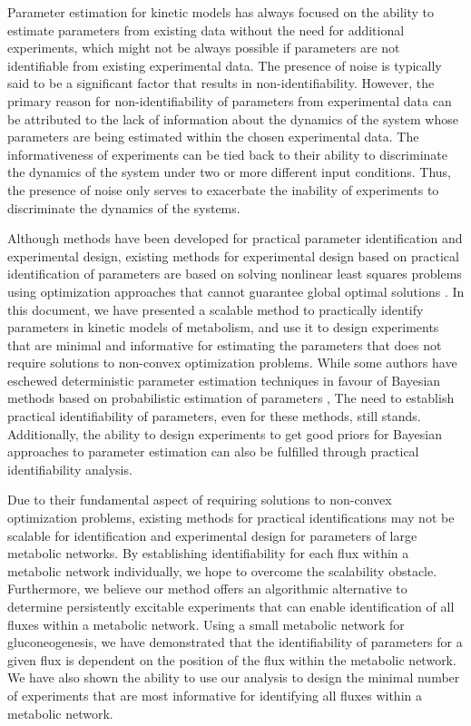 \documentclass[10pt]{article}
\begin{document}
	Parameter estimation for kinetic models has always focused on the ability to estimate parameters from existing data without the need for additional experiments, which might not be always possible if parameters are not identifiable from existing experimental data. The presence of noise is typically said to be a significant factor that results in non-identifiability. However, the primary reason for non-identifiability of parameters from experimental data can be attributed to the lack of information about the dynamics of the system whose parameters are being estimated within the chosen experimental data. The informativeness of experiments can be tied back to their ability to discriminate the dynamics of the system under two or more different input conditions. Thus, the presence of noise only serves to exacerbate the inability of experiments to discriminate the dynamics of the systems. 
	
	Although methods have been developed for practical parameter identification and experimental design, existing methods for experimental design based on practical identification of parameters are based on solving nonlinear least squares problems using optimization approaches that cannot guarantee global optimal solutions \parencite{Raue2009a}. In this document, we have presented a scalable method to practically identify parameters in kinetic models of metabolism, and use it to design experiments that are minimal and informative for estimating the parameters that does not require solutions to non-convex optimization problems. While some authors have eschewed deterministic parameter estimation techniques in favour of Bayesian methods based on probabilistic estimation of parameters \parencite{Saa2016, Saa2016a}, The need to establish practical identifiability of parameters, even for these methods, still stands. Additionally, the ability to design experiments to get good priors for Bayesian approaches to parameter estimation can also be fulfilled through practical identifiability analysis.
	
	Due to their fundamental aspect of requiring solutions to non-convex optimization problems, existing methods for practical identifications may not be scalable for identification and experimental design for parameters of large metabolic networks. By establishing identifiability for each flux within a metabolic network individually, we hope to overcome the scalability obstacle. Furthermore, we believe our method offers an algorithmic alternative to determine persistently excitable experiments that can enable identification of all fluxes within a metabolic network. Using a small metabolic network for gluconeogenesis, we have demonstrated that the identifiability of parameters for a given flux is dependent on the position of the flux within the metabolic network. We have also shown the ability to use our analysis to design the minimal number of experiments that are most informative for identifying all fluxes within a metabolic network.
	
\end{document}
